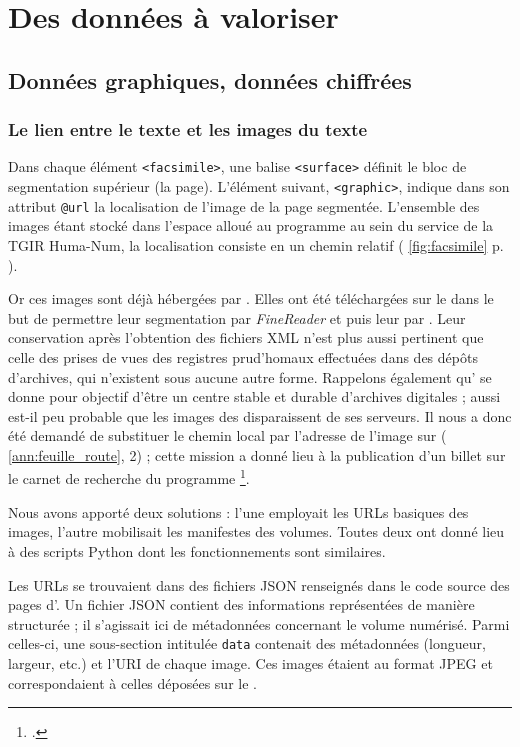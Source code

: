 \part{Des données à valoriser}

\clearpage
\thispagestyle{empty}
\cleardoublepage

\chapter{Données graphiques, données chiffrées}

\section{Le lien entre le texte et les images du texte}

Dans chaque élément \texttt{<facsimile>}, une balise \texttt{<surface>} définit le bloc de segmentation supérieur (la page). L'élément suivant, \texttt{<graphic>}, indique dans son attribut \texttt{@url} la localisation de l'image de la page segmentée. L'ensemble des images étant stocké dans l'espace alloué au programme \timeus{} au sein du service \sharedocs{} de la TGIR Huma-Num, la localisation consiste en un chemin relatif (\fig{} \ref{fig:facsimile} p. \pageref{fig:facsimile}).

Or ces images sont déjà hébergées par \ia. Elles ont été téléchargées sur le \sharedocs{} dans le but de permettre leur segmentation par \textit{FineReader} et \transkribus{} puis leur \ocr{} par \lse. Leur conservation après l'obtention des fichiers XML n'est plus aussi pertinent que celle des prises de vues des registres prud'homaux effectuées dans des dépôts d'archives, qui n'existent sous aucune autre forme. Rappelons également qu'\ia{} se donne pour objectif d’être un centre stable et durable d’archives digitales ; aussi est-il peu probable que les images des \odm{} disparaissent de ses serveurs. Il nous a donc été demandé de substituer le chemin local par l'adresse de l'image sur \ia{} (\ann{} \ref{ann:feuille_route}, \issue{} 2) ; cette mission a donné lieu à la publication d'un billet sur le carnet de recherche du programme \timeus\footcite{genero}.

Nous avons apporté deux solutions : l'une employait les URLs basiques des images, l'autre mobilisait les manifestes \iiif{} des volumes. Toutes deux ont donné lieu à des scripts Python dont les fonctionnements sont similaires.

Les URLs se trouvaient dans des fichiers JSON renseignés dans le code source des pages d'\ia. Un fichier JSON contient des informations représentées de manière structurée ; il s'agissait ici de métadonnées concernant le volume numérisé. Parmi celles-ci, une sous-section intitulée \texttt{data} contenait des métadonnées (longueur, largeur, etc.) et l'URI de chaque image. Ces images étaient au format JPEG et correspondaient à celles déposées sur le \sharedocs. 

